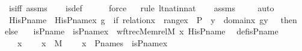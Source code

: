 \begin{isabellebody}
\ is{\isacharunderscore}{\kern0pt}{}{\isacharunderscore}{\kern0pt}iff\ assms\isanewline
\ \ \isamarkupfalse%
\ is{\isacharunderscore}{\kern0pt}{}{\isacharunderscore}{\kern0pt}def\ \isanewline
\ \ \ \isamarkupfalse%
\ force\isanewline
\ \ \isamarkupfalse%
{\isacharparenleft}{\kern0pt}rule\ lt{\isacharunderscore}{\kern0pt}nat{\isacharunderscore}{\kern0pt}in{\isacharunderscore}{\kern0pt}nat{\isacharparenright}{\kern0pt}\isanewline
\ \ \isamarkupfalse%
\ assms\ \isanewline
\ \ \isamarkupfalse%
\ auto%
\endisatagproof
{\isafoldproof}%
%
\isadelimproof
\isanewline
%
\endisadelimproof
\ \ \isanewline
{}\isamarkupfalse%
\ His{\isacharunderscore}{\kern0pt}P{\isacharunderscore}{\kern0pt}name\ \ {\isachardoublequoteopen}His{\isacharunderscore}{\kern0pt}P{\isacharunderscore}{\kern0pt}name{\isacharparenleft}{\kern0pt}x{\isacharcomma}{\kern0pt}\ g{\isacharparenright}{\kern0pt}\ {\isasymequiv}\ if\ relation{\isacharparenleft}{\kern0pt}x{\isacharparenright}{\kern0pt}\ {\isasymand}\ range{\isacharparenleft}{\kern0pt}x{\isacharparenright}{\kern0pt}\ {\isasymsubseteq}\ P\ {\isasymand}\ {\isacharparenleft}{\kern0pt}{\isasymforall}y\ {\isasymin}\ domain{\isacharparenleft}{\kern0pt}x{\isacharparenright}{\kern0pt}{\isachardot}{\kern0pt}\ g{\isacharbackquote}{\kern0pt}y\ {\isacharequal}{\kern0pt}\ {}{\isacharparenright}{\kern0pt}\ then\ {}\ else\ {}{\isachardoublequoteclose}\ \isanewline
\isanewline
{}\isamarkupfalse%
\ is{\isacharunderscore}{\kern0pt}P{\isacharunderscore}{\kern0pt}name\ \ {\isachardoublequoteopen}is{\isacharunderscore}{\kern0pt}P{\isacharunderscore}{\kern0pt}name{\isacharparenleft}{\kern0pt}x{\isacharparenright}{\kern0pt}\ {\isasymequiv}\ wftrec{\isacharparenleft}{\kern0pt}Memrel{\isacharparenleft}{\kern0pt}M{\isacharparenright}{\kern0pt}{\isacharcircum}{\kern0pt}{\isacharplus}{\kern0pt}{\isacharcomma}{\kern0pt}\ x{\isacharcomma}{\kern0pt}\ His{\isacharunderscore}{\kern0pt}P{\isacharunderscore}{\kern0pt}name{\isacharparenright}{\kern0pt}{\isachardoublequoteclose}\ \isanewline
\isanewline
{}\isamarkupfalse%
\ def{\isacharunderscore}{\kern0pt}is{\isacharunderscore}{\kern0pt}P{\isacharunderscore}{\kern0pt}name\ {\isacharcolon}{\kern0pt}\ \isanewline
\ \ \ x\ \isanewline
\ \ \ {\isachardoublequoteopen}x\ {\isasymin}\ M{\isachardoublequoteclose}\ \isanewline
\ \ \ {\isachardoublequoteopen}x\ {\isasymin}\ P{\isacharunderscore}{\kern0pt}names\ {\isasymlongleftrightarrow}\ is{\isacharunderscore}{\kern0pt}P{\isacharunderscore}{\kern0pt}name{\isacharparenleft}{\kern0pt}x{\isacharparenright}{\kern0pt}\ {\isacharequal}{\kern0pt}\ {}{\isachardoublequoteclose}\ \isanewline

\end{isabellebody}
